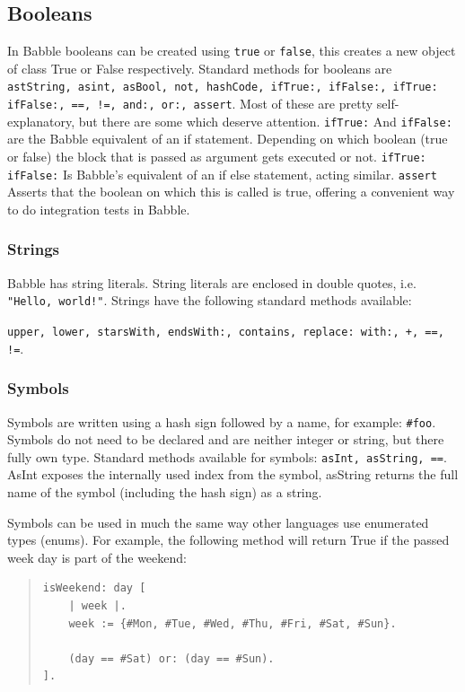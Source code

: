 \documentclass[a4paper]{article}
\begin{document}
\subsection{Booleans}
In Babble booleans can be created using \texttt{true} or  \texttt{false}, this creates a new object of class True or False respectively. Standard methods for booleans are
\texttt{astString, asint, asBool, not, hashCode, ifTrue:, ifFalse:, ifTrue: ifFalse:, ==, !=, and:, or:, assert}. Most of these are pretty self-explanatory, but there are some which deserve attention. \texttt{ifTrue:} And \texttt{ifFalse:} are the Babble equivalent of an if statement. Depending on which boolean (true or false) the block that is passed as argument gets executed or not. \texttt{ifTrue: ifFalse:} Is Babble's equivalent of an if else statement, acting similar. \texttt{assert} Asserts that the boolean on which this is called is true, offering a convenient way to do integration tests in Babble.


\subsubsection{Strings}

Babble has string literals. String literals are enclosed in double quotes, i.e. \texttt{"Hello, world!"}. Strings have the following standard methods available:

\texttt{upper, lower, starsWith, endsWith:, contains, replace: with:, +, ==, !=}.

\subsubsection{Symbols}

Symbols are written using a hash sign followed by a name, for example: \texttt{\#foo}. Symbols do not need to be declared and are neither integer or string, but there fully own type. Standard methods available for symbols:
\texttt{asInt, asString, ==}. AsInt exposes the internally used index from the symbol, asString returns the full name of the symbol (including the hash sign) as a string.

Symbols can be used in much the same way other languages use enumerated types (enums). For example, the following method will return True if the passed week day is part of the weekend:

\begin{quote}
\begin{lstlisting}
isWeekend: day [
	| week |.
	week := {#Mon, #Tue, #Wed, #Thu, #Fri, #Sat, #Sun}.

	(day == #Sat) or: (day == #Sun).
].
\end{lstlisting}
\end{quote}
\end{document}
